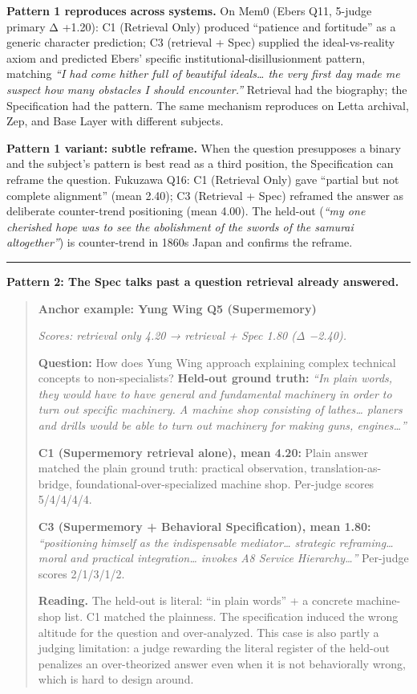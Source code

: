 \textbf{Pattern 1 reproduces across systems.} On Mem0 (Ebers Q11,
5-judge primary Δ +1.20): C1 (Retrieval Only) produced ``patience and
fortitude'' as a generic character prediction; C3 (retrieval + Spec)
supplied the ideal-vs-reality axiom and predicted Ebers' specific
institutional-disillusionment pattern, matching \emph{``I had come
hither full of beautiful ideals\ldots{} the very first day made me
suspect how many obstacles I should encounter.''} Retrieval had the
biography; the Specification had the pattern. The same mechanism
reproduces on Letta archival, Zep, and Base Layer with different
subjects.

\textbf{Pattern 1 variant: subtle reframe.} When the question
presupposes a binary and the subject's pattern is best read as a third
position, the Specification can reframe the question. Fukuzawa Q16: C1
(Retrieval Only) gave ``partial but not complete alignment'' (mean
2.40); C3 (Retrieval + Spec) reframed the answer as deliberate
counter-trend positioning (mean 4.00). The held-out (\emph{``my one
cherished hope was to see the abolishment of the swords of the samurai
altogether''}) is counter-trend in 1860s Japan and confirms the reframe.

\begin{center}\rule{0.5\linewidth}{0.5pt}\end{center}

\textbf{Pattern 2: The Spec talks past a question retrieval already
answered.}

\begin{quote}
\textbf{Anchor example: Yung Wing Q5 (Supermemory)}

\emph{Scores: retrieval only 4.20 → retrieval + Spec 1.80 (Δ −2.40).}

\textbf{Question:} How does Yung Wing approach explaining complex
technical concepts to non-specialists? \textbf{Held-out ground truth:}
\emph{``In plain words, they would have to have general and fundamental
machinery in order to turn out specific machinery. A machine shop
consisting of lathes\ldots{} planers and drills would be able to turn
out machinery for making guns, engines\ldots{}''}

\textbf{C1 (Supermemory retrieval alone), mean 4.20:} Plain answer
matched the plain ground truth: practical observation,
translation-as-bridge, foundational-over-specialized machine shop.
Per-judge scores 5/4/4/4/4.

\textbf{C3 (Supermemory + Behavioral Specification), mean 1.80:}
\emph{``positioning himself as the indispensable mediator\ldots{}
strategic reframing\ldots{} moral and practical integration\ldots{}
invokes A8 Service Hierarchy\ldots{}''} Per-judge scores 2/1/3/1/2.

\textbf{Reading.} The held-out is literal: ``in plain words'' + a
concrete machine-shop list. C1 matched the plainness. The specification
induced the wrong altitude for the question and over-analyzed. This case
is also partly a judging limitation: a judge rewarding the literal
register of the held-out penalizes an over-theorized answer even when it
is not behaviorally wrong, which is hard to design around.
\end{quote}

